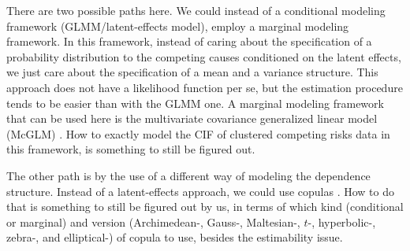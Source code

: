 There are two possible paths here. We could instead of a conditional
modeling framework (GLMM/latent-effects model), employ a marginal
modeling framework. In this framework, instead of caring about the
specification of a probability distribution to the competing causes
conditioned on the latent effects, we just care about the specification
of a mean and a variance structure. This approach does not have a
likelihood function per se, but the estimation procedure tends to be
easier than with the GLMM one. A marginal modeling framework that can be
used here is the multivariate covariance generalized linear model
(McGLM) \cite{mcglm, rmcglm}. How to exactly model the CIF of clustered
competing risks data in this framework, is something to still be figured
out.

The other path is by the use of a different way of modeling the
dependence structure. Instead of a latent-effects approach, we could use
copulas \cite{factorcopulas, cheng&fine12, semiparametricSCHEIKE,
copulas}. How to do that is something to still be figured out by us, in
terms of which kind (conditional or marginal) and version (Archimedean-,
Gauss-, Maltesian-, \(t\)-, hyperbolic-, zebra-, and elliptical-) of
copula to use, besides the estimability issue.

